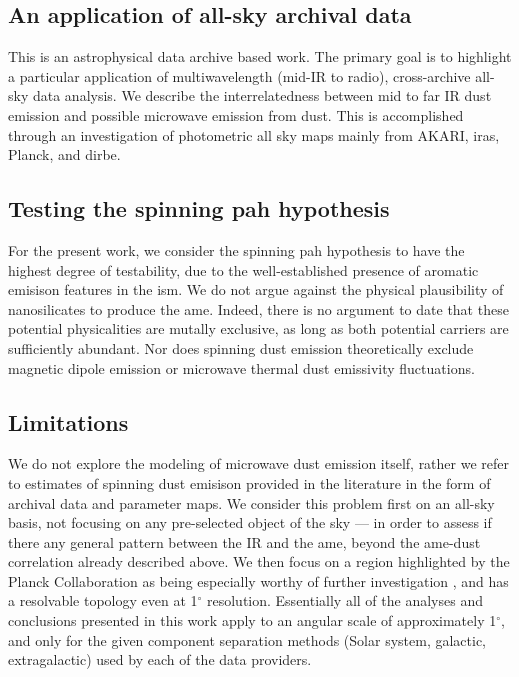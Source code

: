   \subsection{An application of all-sky archival data}
    This is an astrophysical data archive based work. The primary goal is to highlight a particular application of multiwavelength (mid-IR to radio), cross-archive all-sky data analysis. We describe the interrelatedness between mid to far IR dust emission and possible microwave emission from dust. This is accomplished through an investigation of photometric all sky maps mainly from AKARI, \acrshort{iras}, Planck, and \acrshort{dirbe}.

  \subsection{Testing the spinning \acrshort{pah} hypothesis}
    For the present work, we consider the spinning \acrshort{pah} hypothesis to have the highest degree of testability, due to the well-established presence of aromatic emisison features in the \acrshort{ism}.  We do not argue against the physical plausibility of nanosilicates to produce the \acrshort{ame}. Indeed, there is no argument to date that these potential physicalities are mutally exclusive, as long as both potential carriers are sufficiently abundant. Nor does spinning dust emission theoretically exclude magnetic dipole emission or microwave thermal dust emissivity fluctuations.

  \subsection{Limitations}
    We do not explore the modeling of microwave dust emission itself, rather we refer to estimates of spinning dust emisison provided in the literature \citep{planckXII, wmap03b} in the form of archival data and parameter maps. We consider this problem first on an all-sky basis, not focusing on any pre-selected object of the sky --- in order to assess if there any general pattern between the IR and the \acrshort{ame}, beyond the \acrshort{ame}-dust correlation already described above. We then focus on a region highlighted by the Planck Collaboration as being especially worthy of further investigation \citep{planck15X}, and has a resolvable topology even at 1$^\circ$ resolution. Essentially all of the analyses and conclusions presented in this work apply to an angular scale of approximately 1$^\circ$, and only for the given component separation methods (Solar system, galactic, extragalactic) used by each of the data providers.

